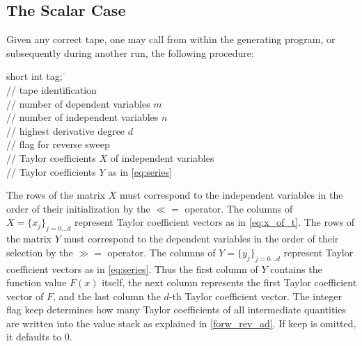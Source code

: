 \documentclass[11pt,twoside]{article}
\begin{document}
\subsection{The Scalar Case}
%
\label{ScaCas}
%     
Given any correct tape, one may call from within
the generating program, or subsequently during another run, the following
procedure:
%
\begin{tabbing}
\hspace{0.5in}\={\sf short int tag;} \hspace{1.1in}\= \kill    %
 \\
         \> // tape identification \\
                 \> // number of dependent variables $m$\\
                 \> // number of independent variables $n$\\
                \> // highest derivative degree $d$\\ 
             \> // flag for reverse sweep \\ 
     \> // Taylor coefficients $X$ of 
                                     independent variables \\
      \> // Taylor coefficients $Y$ as 
                                     in \eqref{eq:series}
\end{tabbing}
%
The rows of the matrix $X$ must correspond to the independent variables in the order of their 
initialization by the \boldmath $\ll=$ \unboldmath operator. The columns of 
$X = \{x_j\}_{j=0\ldots d}$ represent Taylor coefficient vectors as in 
\eqref{eq:x_of_t}. The rows of the matrix $Y$ must
correspond to the
dependent variables in the order of their selection by the \boldmath $\gg=$ \unboldmath operator.
The columns of $Y = \{y_j\}_{j=0\ldots d}$ represent 
Taylor coefficient vectors as in \eqref{eq:series}.
Thus the first column of $Y$ contains the
function value $F(x)$ itself, the next column represents the first
Taylor coefficient vector of $F$, and the last column the 
$d$-th Taylor coefficient vector. The integer flag {\sf keep} determines
how many Taylor coefficients of all intermediate quantities are
written into the value stack as explained in \autoref{forw_rev_ad}.
 If {\sf keep} is omitted, it defaults to 0.
\end{document}
